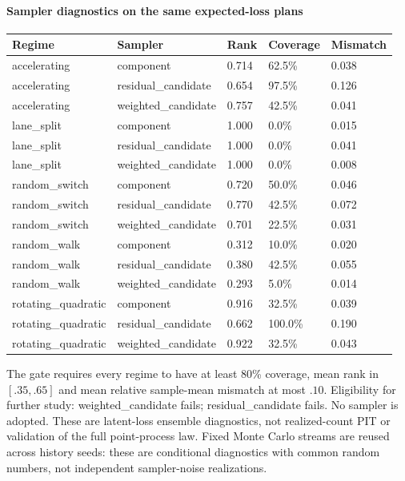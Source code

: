 \paragraph{Sampler diagnostics on the same expected-loss plans}
\begin{center}\small\begin{tabular}{lllll}
\toprule
Regime & Sampler & Rank & Coverage & Mismatch\\\midrule
accelerating & component & 0.714 & 62.5\% & 0.038\\
accelerating & residual\_candidate & 0.654 & 97.5\% & 0.126\\
accelerating & weighted\_candidate & 0.757 & 42.5\% & 0.041\\
lane\_split & component & 1.000 & 0.0\% & 0.015\\
lane\_split & residual\_candidate & 1.000 & 0.0\% & 0.041\\
lane\_split & weighted\_candidate & 1.000 & 0.0\% & 0.008\\
random\_switch & component & 0.720 & 50.0\% & 0.046\\
random\_switch & residual\_candidate & 0.770 & 42.5\% & 0.072\\
random\_switch & weighted\_candidate & 0.701 & 22.5\% & 0.031\\
random\_walk & component & 0.312 & 10.0\% & 0.020\\
random\_walk & residual\_candidate & 0.380 & 42.5\% & 0.055\\
random\_walk & weighted\_candidate & 0.293 & 5.0\% & 0.014\\
rotating\_quadratic & component & 0.916 & 32.5\% & 0.039\\
rotating\_quadratic & residual\_candidate & 0.662 & 100.0\% & 0.190\\
rotating\_quadratic & weighted\_candidate & 0.922 & 32.5\% & 0.043\\
\bottomrule\end{tabular}\end{center}

The gate requires every regime to have at least 80\% coverage, mean rank in $[.35,.65]$ and mean relative sample-mean mismatch at most $.10$. Eligibility for further study: weighted\_candidate fails; residual\_candidate fails. No sampler is adopted. These are latent-loss ensemble diagnostics, not realized-count PIT or validation of the full point-process law. Fixed Monte Carlo streams are reused across history seeds: these are conditional diagnostics with common random numbers, not independent sampler-noise realizations.

